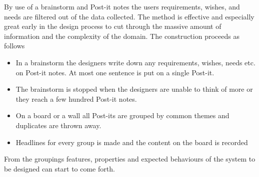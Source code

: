 \begin{method} \label{meth:affinity_diagram} 
  By use of a brainstorm and Post-it notes the users requirements, wishes, and needs are filtered out of the data collected. The method is effective and especially great early in the design process to cut through the massive amount of information and the complexity of the domain. The construction proceeds as follows
  \begin{itemize}
    \item In a brainstorm the designers write down any requirements, wishes, needs etc. on Post-it notes. At most one sentence is put on a single Post-it.
    \item The brainstorm is stopped when the designers are unable to think of more or they reach a few hundred Post-it notes.
    \item On a board or a wall all Post-its are grouped by common themes and duplicates are thrown away.
    \item Headlines for every group is made and the content on the board is recorded
  \end{itemize}
  From the groupings features, properties and expected behaviours of the system to be designed can start to come forth. \cite[p. 299-300]{benyon_10}
\end{method}